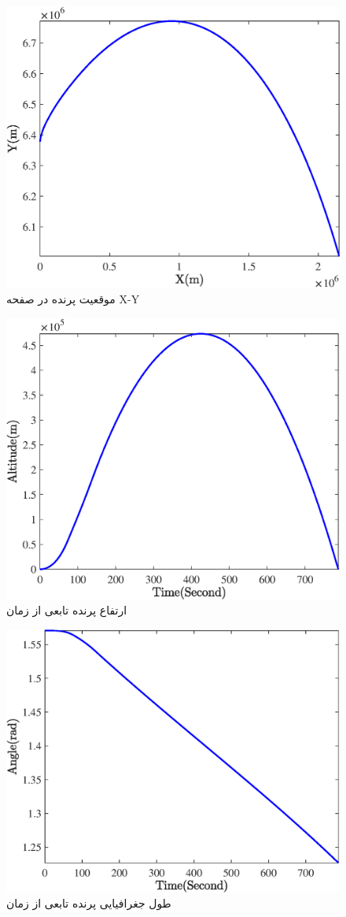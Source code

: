 \begin{figure}[H]
	\centering
	\includegraphics[width=.75\linewidth]{../Figure/Q1/c/xy}
	\caption{موقعیت پرنده در صفحه X-Y  }
\end{figure}


\begin{figure}[H]
	\centering
	\includegraphics[width=.75\linewidth]{../Figure/Q1/c/alt}
	\caption{ارتفاع پرنده تابعی از زمان}
\end{figure}


\begin{figure}[H]
	\centering
	\includegraphics[width=.75\linewidth]{../Figure/Q1/c/angle}
	\caption{طول جغرافیایی پرنده تابعی از زمان}
\end{figure}


